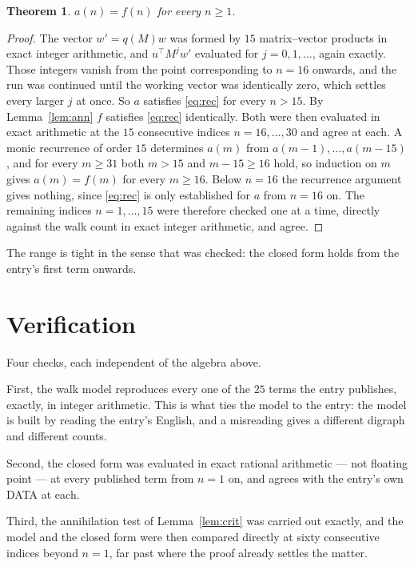 \documentclass[11pt,a4paper]{article}
\theoremstyle{plain}
\newtheorem{theorem}{Theorem}
\theoremstyle{definition}
\begin{document}
\begin{theorem}
$a(n)=f(n)$ for every $n\ge1$.
\end{theorem}

\begin{proof}
The vector $w'=q(M)w$ was formed by $15$ matrix--vector products in exact integer
arithmetic, and $u^{\!\top}M^{j}w'$ evaluated for $j=0,1,\dots$, again exactly. Those integers
vanish from the point corresponding to $n=16$ onwards, and the run was continued until the
working vector was identically zero, which settles every larger $j$ at once. So $a$ satisfies
\eqref{eq:rec} for every $n>15$. By Lemma~\ref{lem:ann} $f$ satisfies \eqref{eq:rec}
identically. Both were then evaluated in exact arithmetic at the $15$ consecutive indices
$n=16,\dots,30$ and agree at each. A monic recurrence of order $15$
determines $a(m)$ from $a(m-1),\dots,a(m-15)$, and for every $m\ge31$ both
$m>15$ and $m-15\ge16$ hold, so induction on $m$ gives $a(m)=f(m)$ for every
$m\ge16$.
Below $n=16$ the recurrence argument gives nothing, since \eqref{eq:rec} is only
established for $a$ from $n=16$ on. The remaining indices $n=1,\dots,15$ were
therefore checked one at a time, directly against the walk count in exact integer arithmetic,
and agree.
\end{proof}

The range is tight in the sense that was checked: the closed form holds from the entry's first term onwards.

\section{Verification}

Four checks, each independent of the algebra above.

First, the walk model reproduces every one of the $25$ terms the entry publishes,
exactly, in integer arithmetic. This is what ties the model to the entry: the model is built
by reading the entry's English, and a misreading gives a different digraph and different
counts.

Second, the closed form was evaluated in exact rational arithmetic --- not floating point ---
at every published term from $n=1$ on, and agrees with the entry's own DATA at each.

Third, the annihilation test of Lemma~\ref{lem:crit} was carried out exactly, and the model
and the closed form were then compared directly at sixty consecutive indices beyond
$n=1$, far past where the proof already settles the matter.
\end{document}
